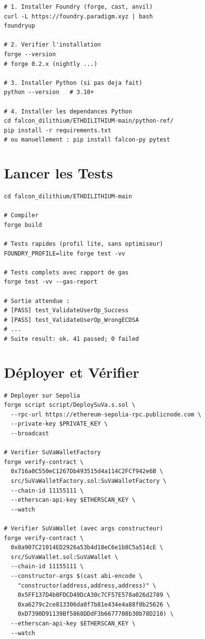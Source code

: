 \documentclass[11pt,a4paper]{article}
\begin{document}
\begin{lstlisting}[style=bash]
# 1. Installer Foundry (forge, cast, anvil)
curl -L https://foundry.paradigm.xyz | bash
foundryup

# 2. Verifier l'installation
forge --version
# forge 0.2.x (nightly ...)

# 3. Installer Python (si pas deja fait)
python --version   # 3.10+

# 4. Installer les dependances Python
cd falcon_dilithium/ETHDILITHIUM-main/python-ref/
pip install -r requirements.txt
# ou manuellement : pip install falcon-py pytest
\end{lstlisting}

\section{Lancer les Tests}

\begin{lstlisting}[style=bash]
cd falcon_dilithium/ETHDILITHIUM-main

# Compiler
forge build

# Tests rapides (profil lite, sans optimiseur)
FOUNDRY_PROFILE=lite forge test -vv

# Tests complets avec rapport de gas
forge test -vv --gas-report

# Sortie attendue :
# [PASS] test_ValidateUserOp_Success
# [PASS] test_ValidateUserOp_WrongECDSA
# ...
# Suite result: ok. 41 passed; 0 failed
\end{lstlisting}

\section{Déployer et Vérifier}

\begin{lstlisting}[style=bash]
# Deployer sur Sepolia
forge script script/DeploySuVa.s.sol \
  --rpc-url https://ethereum-sepolia-rpc.publicnode.com \
  --private-key $PRIVATE_KEY \
  --broadcast

# Verifier SuVaWalletFactory
forge verify-contract \
  0x716a0C550eC1267Db493515d4a114C2FCf942e6B \
  src/SuVaWalletFactory.sol:SuVaWalletFactory \
  --chain-id 11155111 \
  --etherscan-api-key $ETHERSCAN_KEY \
  --watch

# Verifier SuVaWallet (avec args constructeur)
forge verify-contract \
  0x8a907C21014ED2926a53b4d18eC6e1b8C5a514cE \
  src/SuVaWallet.sol:SuVaWallet \
  --chain-id 11155111 \
  --constructor-args $(cast abi-encode \
    "constructor(address,address,address)" \
    0x5FF137D4b0FDCD49DcA30c7CF57E578a026d2789 \
    0xa6279c2ce813306da0f7b81e434e4a88f0b25626 \
    0xD7390D91139Bf5868DDdF3b6677708b30b78D210) \
  --etherscan-api-key $ETHERSCAN_KEY \
  --watch
\end{lstlisting}
\end{document}
